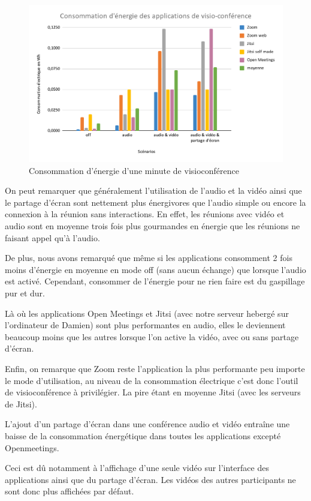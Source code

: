 \documentclass[11pt,a4paper]{report}
\begin{document}
\begin{figure}[h]
  \centering
  \includegraphics[width=1\linewidth]{graph_energie.pdf}
  \caption{Consommation d'énergie d'une minute de visioconférence}
  \label{fig:graph_energie}
\end{figure}

On peut remarquer que généralement l'utilisation de l'audio et la vidéo ainsi que le partage d'écran sont nettement plus énergivores que l'audio simple ou encore la connexion à la réunion sans interactions. En effet, les réunions avec vidéo et audio sont en moyenne trois fois plus gourmandes en énergie que les réunions ne faisant appel qu'à l'audio.

De plus, nous avons remarqué que même si les applications consomment 2 fois moins d'énergie en moyenne en mode off (sans aucun échange) que lorsque l'audio est activé. Cependant, consommer de l'énergie pour ne rien faire est du gaspillage pur et dur.

Là où les applications Open Meetings et Jitsi (avec notre serveur hebergé sur l'ordinateur de Damien) sont plus performantes en audio, elles le deviennent beaucoup moins que les autres lorsque l'on active la vidéo, avec ou sans partage d'écran.

Enfin, on remarque  que Zoom reste l'application la plus performante peu importe le mode d'utilisation, au niveau de la consommation électrique c'est donc l'outil de visioconférence à privilégier. La pire étant en moyenne Jitsi (avec les serveurs de Jitsi).

\br L'ajout d'un partage d'écran dans une conférence audio et vidéo entraîne une baisse de la consommation énergétique dans toutes les applications excepté Openmeetings.

\noindent Ceci est dû notamment à l'affichage d'une seule vidéo sur l'interface des applications ainsi que du partage d'écran. Les vidéos des autres participants ne sont donc plus affichées par défaut.
\end{document}
